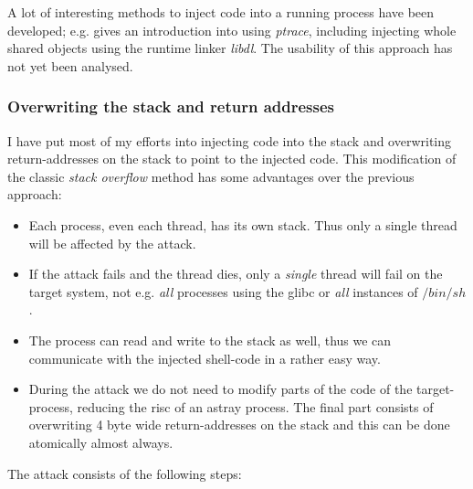 A lot of interesting methods to inject code into a running process have been
developed; e.g.  \cite{phrack59.8:2002} gives an introduction into using
\emph{ptrace}, including injecting whole shared objects using the runtime linker
\emph{libdl}.  The usability of this approach has not yet been analysed.


\subsubsection{Overwriting the stack and return addresses}

\label{overwriting_stack} I have put most of my efforts into injecting code into
the stack and overwriting return-addresses on the stack to point to the injected
code. This modification of the classic \emph{stack overflow} method has some
advantages over the previous approach:

\begin{itemize}

	\item Each process, even each thread, has its own stack. Thus only a
		single thread will be affected by the attack.

	\item If the attack fails and the thread dies, only a \emph{single}
		thread will fail on the target system, not e.g. \emph{all}
		processes using the glibc or \emph{all} instances of $/bin/sh$.

	\item The process can read and write to the stack as well, thus we can
		communicate with the injected shell-code in a rather easy way.

	\item During the attack we do not need to modify parts of the code of
		the target-process, reducing the risc of an astray process. The
		final part consists of overwriting 4 byte wide return-addresses
		on the stack and this can be done atomically almost always.

\end{itemize}

The attack consists of the following steps:

